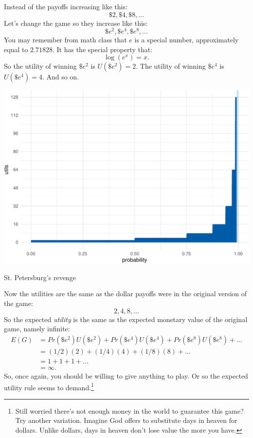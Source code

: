 \documentclass[justified]{tufte-book}
\renewcommand{\u}{U}
\newcommand{\p}{Pr}
\newcommand{\E}{E}
\theoremstyle{definition}
\theoremstyle{definition}
\theoremstyle{definition}
\theoremstyle{definition}
\theoremstyle{remark}
\begin{document}
Instead of the payoffs increasing like this:
\[ \$2, \$4, \$8, \ldots \]
Let's change the game so they increase like this:
\[ \$e^2, \$e^4, \$e^8, \ldots \]
You may remember from math class that \(e\) is a special number, approximately equal to \(2.71828\). It has the special property that:
\[ \log(e^x) = x. \]
So the utility of winning \(\$e^2\) is \(\u(\$e^2) = 2\). The utility of winning \(\$e^4\) is \(\u(\$e^4) = 4\). And so on.

\begin{marginfigure}
\includegraphics{_main_files/figure-latex/expstp-1} \caption[St]{St. Petersburg's revenge}\label{fig:expstp}
\end{marginfigure}

Now the utilities are the same as the dollar payoffs were in the original version of the game:
\[ 2, 4, 8, \ldots \]
So the expected \emph{utility} is the same as the expected monetary value of the original game, namely infinite:
\[
  \begin{aligned}
     \E(G) &= \p(\$e^2) \u(\$e^2) + \p(\$e^4) \u(\$e^4) + \p(\$e^8) \u(\$e^8) + \ldots\\
          &= (1/2)(2) + (1/4)(4) + (1/8)(8) + \ldots\\
          &= 1 + 1 + 1 + \ldots\\
          &= \infty.
  \end{aligned}
\]
So, once again, you should be willing to give anything to play. Or so the expected utility rule seems to demand.\footnote{Still worried there's not enough money in the world to guarantee this game? Try another variation. Imagine God offers to substitute days in heaven for dollars. Unlike dollars, days in heaven don't lose value the more you have.}
\end{document}
